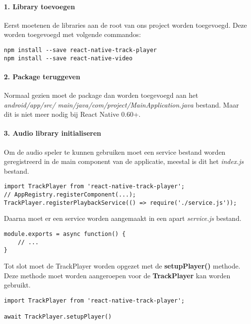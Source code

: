 \paragraph{1. Library toevoegen}
Eerst moetenen de libraries aan de root van ons project worden toegevoegd. 
Deze worden toegevoegd met volgende commandos:
\begin{verbatim}
npm install --save react-native-track-player
npm install --save react-native-video
\end{verbatim}

\paragraph{2. Package teruggeven}
Normaal gezien moet de package dan worden toegevoegd aan het 
\textit{android/app/src/} \textit{main/java/com/project/MainApplication.java} bestand.
Maar dit is niet meer nodig bij React Native 0.60+.

\paragraph{3. Audio library initialiseren}
Om de audio speler te kunnen gebruiken moet een service bestand worden geregistreerd in de main 
component van de applicatie, meestal is dit het \textit{index.js} bestand.
\begin{verbatim}
import TrackPlayer from 'react-native-track-player';
// AppRegistry.registerComponent(...);
TrackPlayer.registerPlaybackService(() => require('./service.js'));
\end{verbatim}
Daarna moet er een service worden aangemaakt in een apart \textit{service.js} bestand.
\begin{verbatim}
module.exports = async function() {
    // ...
}
\end{verbatim}
Tot slot moet de TrackPlayer worden opgezet met de \textbf{setupPlayer()} methode. Deze methode
moet worden aangeroepen voor de \textbf{TrackPlayer} kan worden gebruikt.
\begin{verbatim}
import TrackPlayer from 'react-native-track-player';

await TrackPlayer.setupPlayer()
\end{verbatim}

